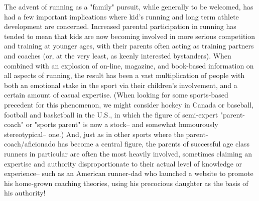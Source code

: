 The advent of running as a "family" pursuit, while generally to be welcomed, has had a few important implications where kid's running and long term athlete development are concerned. Increased parental participation in running has tended to mean that kids are now becoming involved in more serious competition and training at younger ages, with their parents often acting as training partners and coaches (or, at the very least, as keenly interested bystanders). When combined with an explosion of on-line, magazine, and book-based information on all aspects of running, the result has been a vast multiplication of people with both an emotional stake in the sport via their children's involvement, and a certain amount of casual expertise. (When looking for some sports-based precedent for this phenomenon, we might consider hockey in Canada or baseball, football and basketball in the U.S., in which the figure of semi-expert "parent-coach" or "sports parent" is now a stock-- and somewhat humourously stereotypical-- one.) And, just as in other sports where the parent-coach/aficionado has become a central figure, the parents of successful age class runners in particular are often the most heavily involved, sometimes claiming an expertise and authority disproportionate to their actual level of knowledge or experience-- such as an American runner-dad who launched a website to promote his home-grown coaching theories, using his precocious daughter as the basis of his authority!

